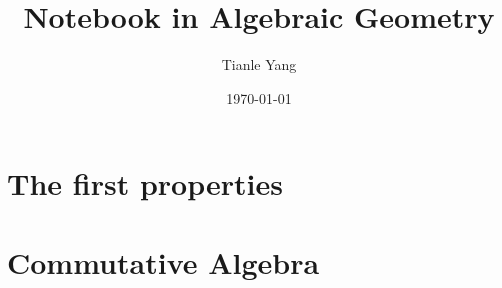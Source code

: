 \documentclass{notetobook}
\title{Notebook in Algebraic Geometry}
\author{Tianle Yang}
\date{\today}
\begin{document}
    \pagestyle{empty}
    \maketitle

    \frontmatter
    \pagestyle{mainmatterstyle}

    \tableofcontents

    \mainmatter
 
    \chapter{The first properties}
         
        

    \appendix

    \chapter{Commutative Algebra}
        
        
        

    \printbibliography
    
\end{document}
